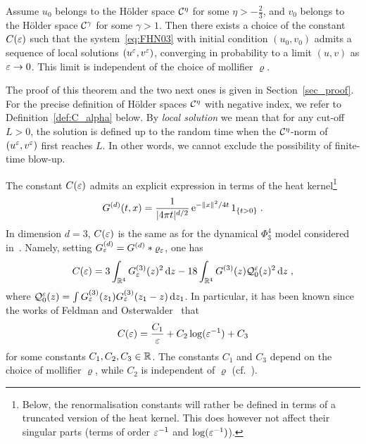\documentclass[reqno,11pt]{article}
\begin{document}
\begin{theorem}
\label{thm:FHN}
Assume $u_0$ belongs to the H\"older space ${\mathcal C}^\eta$ for some $\eta>-\frac23$,
and $v_0$ belongs to the H\"older space ${\mathcal C}^\gamma$ for some $\gamma>1$. Then
there exists a choice of the constant $C(\varepsilon)$ such that the
system~\eqref{eq:FHN03} with initial condition $(u_0,v_0)$ admits a sequence of
local solutions $(u^\varepsilon,v^\varepsilon)$, converging in probability to a limit $(u,v)$
as $\varepsilon\to0$. This limit is independent of the choice of mollifier $\varrho$.  
\end{theorem}

The proof of this theorem and the two next ones is given in
Section~\ref{sec_proof}. For the precise definition of H\"older spaces
${\mathcal C}^\eta$ with negative index, we refer to Definition~\ref{def:C_alpha} below.
By \emph{local solution} we mean that for any cut-off $L>0$, the solution is
defined up to the random time when the ${\mathcal C}^\eta$-norm of $(u^\varepsilon,v^\varepsilon)$ 
first reaches $L$. In other words, we cannot exclude the possibility of
finite-time blow-up. 

The constant $C(\varepsilon)$ admits an explicit expression in terms of the heat
kernel\footnote{Below, the renormalisation constants will rather be defined in
terms of a truncated version of the heat kernel. This does however not affect
their singular parts (terms of order $\varepsilon^{-1}$ and $\log(\varepsilon^{-1})$).}
\begin{equation}
 \label{eq:FHN04}
 G^{(d)}(t,x) = \frac{1}{\abs{4\pi t}^{d/2}} \e^{-\norm{x}^2/4t}
\indexfct{t>0}\;.
\end{equation}
In dimension $d=3$, $C(\varepsilon)$ is the same as for the dynamical $\Phi_3^4$ model
considered in~\cite{Hairer2014}. Namely, setting $G^{(d)}_\varepsilon =
G^{(d)}*\varrho_\varepsilon$, one
has 
\begin{equation}
 \label{eq:FHN05}
 C(\eps) = 3\int_{\R^4}G^{(3)}_\eps(z)^2\6z
 - 18 \int_{\R^4}G^{(3)}(z)\cQ^\eps_0(z)^2\6z\;,
\end{equation} 
where ${\mathcal Q}^\varepsilon_0(z) = \int G^{(3)}_\varepsilon(z_1)G^{(3)}_\varepsilon(z_1-z)\operatorname{d}\!z_1$. In
particular, it has been known since the works of Feldman and
Osterwalder~\cite{Feldman74,Feldman_Osterwalder_76} that 
\begin{equation}
 \label{eq:FHN06}
 C(\eps) = \frac{C_1}{\eps} + C_2 \log(\eps^{-1}) + C_3
\end{equation} 
for some constants $C_1, C_2, C_3\in\mathbb{R}$. The constants $C_1$ and $C_3$ depend on
the choice of mollifier  $\varrho$, while $C_2$ is independent of $\varrho$
(cf.~\cite[Rem.~6.2]{Hairer_Ln_2013}). 
\end{document}
